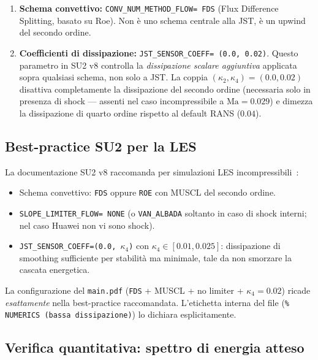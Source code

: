 \documentclass[11pt,a4paper]{article}
\newcommand{\ttcfg}[1]{\texttt{\color{codegray}#1}}
\newcommand{\Ma}{\mathrm{Ma}}
\begin{document}
\begin{enumerate}
  \item \textbf{Schema convettivo:} \ttcfg{CONV\_NUM\_METHOD\_FLOW=
    FDS} (Flux Difference Splitting, basato su Roe). Non è uno
    schema centrale alla JST, è un upwind del secondo ordine.
  \item \textbf{Coefficienti di dissipazione:}
    \ttcfg{JST\_SENSOR\_COEFF= (0.0, 0.02)}. Questo
    parametro in SU2 v8 controlla la \emph{dissipazione
    scalare aggiuntiva} applicata sopra qualsiasi schema, non solo a
    JST. La coppia $(\kappa_{2}, \kappa_{4}) = (0.0, 0.02)$ disattiva
    completamente la dissipazione del secondo ordine
    (necessaria solo in presenza di shock --- assenti nel caso
    incompressibile a $\Ma=0.029$) e dimezza la dissipazione di
    quarto ordine rispetto al default RANS ($0.04$).
\end{enumerate}

\subsection{Best-practice SU2 per la LES}

La documentazione SU2 v8 raccomanda per simulazioni LES
incompressibili~\cite{Economon2016,Aupoix2017}:

\begin{itemize}
  \item Schema convettivo: \texttt{FDS} oppure \texttt{ROE} con
    MUSCL del secondo ordine.
  \item \texttt{SLOPE\_LIMITER\_FLOW= NONE} (o \texttt{VAN\_ALBADA}
    soltanto in caso di shock interni; nel caso Huawei non vi sono
    shock).
  \item \texttt{JST\_SENSOR\_COEFF=(0.0, $\kappa_{4}$)} con
    $\kappa_{4}\in[0.01, 0.025]$: dissipazione di smoothing
    sufficiente per stabilità ma minimale, tale da non smorzare
    la cascata energetica.
\end{itemize}

La configurazione del \texttt{main.pdf} (\texttt{FDS} + MUSCL + no
limiter + $\kappa_{4}=0.02$) ricade \emph{esattamente} nella
best-practice raccomandata. L'etichetta interna del file
(\texttt{\% NUMERICS (bassa dissipazione)}) lo dichiara
esplicitamente.

\subsection{Verifica quantitativa: spettro di energia atteso}
\end{document}
